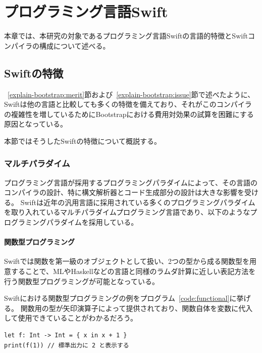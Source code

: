 \chapter{プログラミング言語Swift}
\label{explain-swift}

本章では、本研究の対象であるプログラミング言語Swiftの言語的特徴とSwiftコンパイラの構成について述べる。

\section{Swiftの特徴}
\label{explain-swift:features}

~\ref{explain-bootstrap:merit}節および~\ref{explain-bootstrap:issue}節で述べたように、Swiftは他の言語と比較しても多くの特徴を備えており、それがこのコンパイラの複雑性を増しているためにBootstrapにおける費用対効果の試算を困難にする原因となっている。

本節ではそうしたSwiftの特徴について概説する。

\subsection{マルチパラダイム}

プログラミング言語が採用するプログラミングパラダイムによって、その言語のコンパイラの設計、特に構文解析器とコード生成部分の設計は大きな影響を受ける。
Swiftは近年の汎用言語に採用されている多くのプログラミングパラダイムを取り入れているマルチパラダイムプログラミング言語であり、以下のようなプログラミングパラダイムを採用している。

\subsubsection{関数型プログラミング}

Swiftでは関数を第一級のオブジェクトとして扱い、2つの型から成る関数型を用意することで、MLやHaskellなどの言語と同様のラムダ計算に近しい表記方法を行う関数型プログラミングが可能となっている。

Swiftにおける関数型プログラミングの例をプログラム~\ref{code:functional}に挙げる。
関数用の型が矢印演算子によって提供されており、関数自体を変数に代入して使用できていることがわかるだろう。

\begin{lstlisting}[caption=Swiftにおける関数型プログラミングの例, label=code:functional]
let f: Int -> Int = { x in x + 1 }
print(f(1)) // 標準出力に 2 と表示する
\end{lstlisting}


